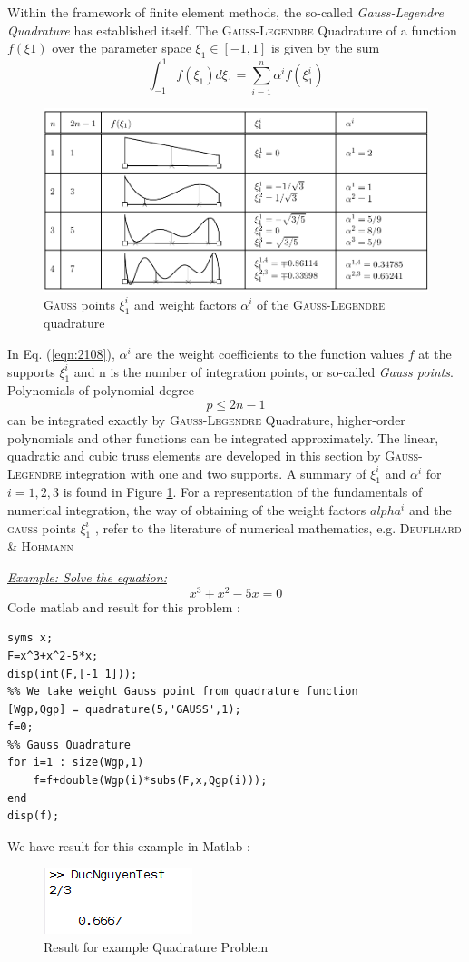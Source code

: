 Within the framework of finite element methods, the so-called \textit{Gauss-Legendre Quadrature} has
established itself. The \textsc{Gauss-Legendre} Quadrature of a function $f(\xi 1)$ over the parameter
space $\xi_1 \in [−1, 1]$ is given by the sum
\begin{equation}
\label{eqn:2108}
     \int_{-1}^{1} f\left(\xi_{1}\right) d \xi_{1}=\sum_{i=1}^{n} \alpha^{i} f\left(\xi_{1}^{i}\right) 
\end{equation}
\begin{figure}[H]
    \centering
    \includegraphics[scale=0.4]{Figures/Chapter2/quadrature.png}
    \caption{\textsc{Gauss} points $\xi_1^i$ and weight factors $\alpha^i$ of the \textsc{Gauss-Legendre} quadrature}
    \label{fig:222}
\end{figure}
In Eq. (\ref{eqn:2108}), $\alpha^i$ are the weight coefficients to the function values $f$ at the supports $\xi_1^i$ and n
is the number of integration points, or so-called \textit{Gauss points}. Polynomials of polynomial degree
\begin{equation}
    p\le 2n-1
\end{equation}
can be integrated exactly by \textsc{Gauss-Legendre} Quadrature, higher-order polynomials and other
functions can be integrated approximately. The linear, quadratic and cubic truss elements are
developed in this section by \textsc{Gauss-Legendre} integration with one and two supports. A summary of $\xi_1^i$ and $\alpha^i$ for $i = 1, 2, 3 $ is found in Figure \ref{fig:222}. For a representation of the fundamentals
of numerical integration, the way of obtaining of the weight factors $alpha^i$ and the \textsc{gauss} points $\xi_1^i$ , refer to the literature of numerical mathematics, e.g. \textsc{Deuflhard & Hohmann}

\textit{\underline{Example: Solve the equation:}}
\begin{equation*}
    x^3+x^2-5x=0
\end{equation*}
Code matlab and result for this problem :
\begin{lstlisting}
syms x;
F=x^3+x^2-5*x;
disp(int(F,[-1 1])); 
%% We take weight Gauss point from quadrature function
[Wgp,Qgp] = quadrature(5,'GAUSS',1); 
f=0;
%% Gauss Quadrature
for i=1 : size(Wgp,1)
    f=f+double(Wgp(i)*subs(F,x,Qgp(i)));
end
disp(f);
\end{lstlisting}

We have result for this example in Matlab : 
\begin{figure}[H]
    \centering
    \includegraphics{Figures/Chapter2/resultQuadrature.png}
    \caption{Result for example Quadrature Problem}
    \label{fig:QDTP}
\end{figure}